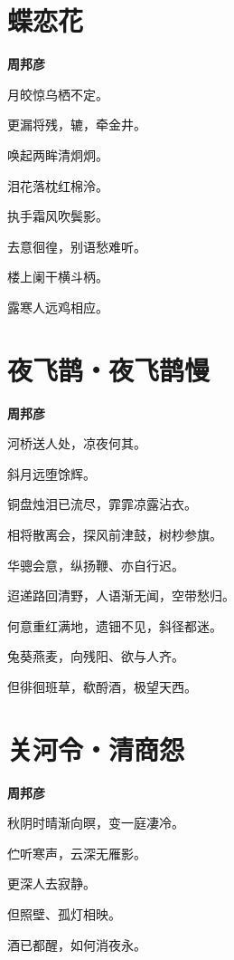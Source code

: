 \documentclass[12pt,a4paper]{ctexbook}
\begin{document}
\section{蝶恋花}
\textbf{周邦彦}\par\vspace{0.5em}
月皎惊乌栖不定。\par
更漏将残，辘，牵金井。\par
唤起两眸清炯炯。\par
泪花落枕红棉泠。\par
执手霜风吹鬓影。\par
去意徊徨，别语愁难听。\par
楼上阑干横斗柄。\par
露寒人远鸡相应。\par

\section{夜飞鹊・夜飞鹊慢}
\textbf{周邦彦}\par\vspace{0.5em}
河桥送人处，凉夜何其。\par
斜月远堕馀辉。\par
铜盘烛泪已流尽，霏霏凉露沾衣。\par
相将散离会，探风前津鼓，树杪参旗。\par
华骢会意，纵扬鞭、亦自行迟。\par
迢递路回清野，人语渐无闻，空带愁归。\par
何意重红满地，遗钿不见，斜径都迷。\par
兔葵燕麦，向残阳、欲与人齐。\par
但徘徊班草，欷酹酒，极望天西。\par

\section{关河令・清商怨}
\textbf{周邦彦}\par\vspace{0.5em}
秋阴时晴渐向暝，变一庭凄冷。\par
伫听寒声，云深无雁影。\par
更深人去寂静。\par
但照壁、孤灯相映。\par
酒已都醒，如何消夜永。\par
\end{document}
